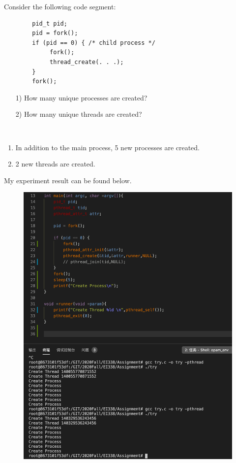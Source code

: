 \begin{exercise}[]{Consider the following code segment:
    \begin{verbatim}
        pid_t pid;
        pid = fork();
        if (pid == 0) { /* child process */
             fork();
             thread_create(. . .);
        }
        fork();
    \end{verbatim}
    \begin{enumerate}
        \item [1)]
        How many unique processes are created?
        \item [2)]
        How many unique threads are created?
    \end{enumerate}
    }
  \begin{solution}
  \par{~}
  \begin{enumerate}
      \item In addition to the main process, 5 new processes are created.
      \item 2 new threads are created.
  \end{enumerate}
  My experiment result can be found below.
  \begin{figure}[h]
    \begin{center}
        \includegraphics[scale=0.6]{ex7.png}
    \end{center}
    \end{figure}
  \end{solution}
  \label{ex2}
\end{exercise}
